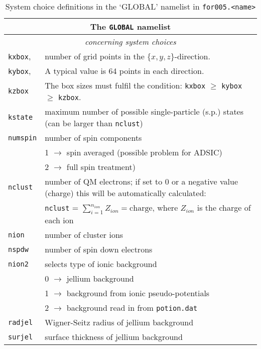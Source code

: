 \documentclass[11pt,a4paper]{article}
\begin{document}
		\begin{table}[t]
			\caption{System choice definitions in the `GLOBAL' namelist in \texttt{for005.<name>}}\label{tab:input-params-sys-choice}
			\begin{tabular}{|p{3.5cm}|p{11.2cm}|}
				\hline
				\multicolumn{2}{|c|}{The \texttt{GLOBAL} namelist}\\
				\hline
				\multicolumn{2}{|c|}{\textit{\color{activeColor}concerning system choices}}\\
				\hline
				\texttt{kxbox}, & number of grid points in the $\{x,y,z\}$-direction.\\
				\texttt{kybox}, & A typical value is 64 points in each direction.\\
				\texttt{kzbox} & The box sizes must fulfil the condition: \texttt{kxbox} $\geq$ \texttt{kybox} $\geq$ \texttt{kzbox}.\\
				\hline
				\texttt{kstate}& maximum number of possible single-particle (s.p.) states (can be larger than \texttt{nclust})\\
			  	\hline
				\texttt{numspin}& number of spin components\\
				& 1 $\rightarrow$ spin averaged (possible problem for ADSIC)\\
				& 2 $\rightarrow$ full spin treatment)\\
				\hline
				\texttt{nclust}& number of QM electrons; if set to 0 or a negative value (charge) this will be automatically calculated: \\
				& \texttt{nclust} = $\sum_{i=1}^{n_{ion}} Z_{ion} = \mathrm{charge}$, where $Z_{ion}$ is the charge of each ion\\
				\hline
				\texttt{nion}& number of cluster ions\\
				\hline
				\texttt{nspdw}& number of spin down electrons \\
				\hline
				\texttt{nion2}& selects type of ionic background \\
				                       &  0 $\rightarrow$ jellium background \\
				                       &  1 $\rightarrow$ background from ionic pseudo-potentials\\
				                       &  2 $\rightarrow$ background read in from \texttt{potion.dat}\\
				\hline
				\texttt{radjel           }& Wigner-Seitz radius of jellium background\\
				\hline
				\texttt{surjel         }& surface thickness of jellium background\\

\end{tabular}
\end{table}
\end{document}

